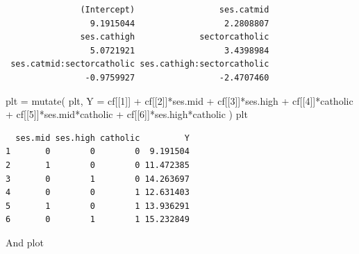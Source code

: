 \documentclass[
  letterpaper,
  DIV=11,
  numbers=noendperiod]{scrreprt}
\newenvironment{Shaded}{}{}
\newcommand{\AttributeTok}[1]{\textcolor[rgb]{0.49,0.56,0.16}{#1}}
\newcommand{\DecValTok}[1]{\textcolor[rgb]{0.25,0.63,0.44}{#1}}
\newcommand{\FunctionTok}[1]{\textcolor[rgb]{0.02,0.16,0.49}{#1}}
\newcommand{\NormalTok}[1]{#1}
\newcommand{\OtherTok}[1]{\textcolor[rgb]{0.00,0.44,0.13}{#1}}
\newcommand{\SpecialCharTok}[1]{\textcolor[rgb]{0.25,0.44,0.63}{#1}}
\begin{document}
\begin{verbatim}
               (Intercept)                 ses.catmid 
                 9.1915044                  2.2808807 
               ses.cathigh             sectorcatholic 
                 5.0721921                  3.4398984 
 ses.catmid:sectorcatholic ses.cathigh:sectorcatholic 
                -0.9759927                 -2.4707460 
\end{verbatim}

\begin{Shaded}
\begin{Highlighting}[]
\NormalTok{plt }\OtherTok{=} \FunctionTok{mutate}\NormalTok{( plt,}
              \AttributeTok{Y =}\NormalTok{ cf[[}\DecValTok{1}\NormalTok{]] }\SpecialCharTok{+}\NormalTok{ cf[[}\DecValTok{2}\NormalTok{]]}\SpecialCharTok{*}\NormalTok{ses.mid }\SpecialCharTok{+}\NormalTok{ cf[[}\DecValTok{3}\NormalTok{]]}\SpecialCharTok{*}\NormalTok{ses.high }\SpecialCharTok{+}
\NormalTok{                cf[[}\DecValTok{4}\NormalTok{]]}\SpecialCharTok{*}\NormalTok{catholic }\SpecialCharTok{+}\NormalTok{ cf[[}\DecValTok{5}\NormalTok{]]}\SpecialCharTok{*}\NormalTok{ses.mid}\SpecialCharTok{*}\NormalTok{catholic }\SpecialCharTok{+}\NormalTok{ cf[[}\DecValTok{6}\NormalTok{]]}\SpecialCharTok{*}\NormalTok{ses.high}\SpecialCharTok{*}\NormalTok{catholic )}
\NormalTok{plt}
\end{Highlighting}
\end{Shaded}

\begin{verbatim}
  ses.mid ses.high catholic         Y
1       0        0        0  9.191504
2       1        0        0 11.472385
3       0        1        0 14.263697
4       0        0        1 12.631403
5       1        0        1 13.936291
6       0        1        1 15.232849
\end{verbatim}

And plot
\end{document}
